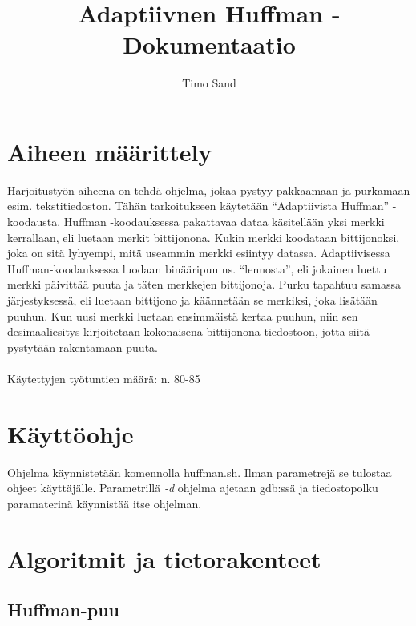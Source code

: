 \documentclass[11pt,a4paper,draft]{article}
\author{Timo Sand}
\title{Adaptiivnen Huffman - Dokumentaatio}
\begin{document}
	
	
	\pagestyle{headings}
	
	\tableofcontents
	\thispagestyle{empty}
	\newpage
	\setcounter{page}{1}
	
	\section{Aiheen määrittely} %
	\label{sec:aiheen_maarittely}
	
	Harjoitustyön aiheena on tehdä ohjelma, jokaa pystyy pakkaamaan ja purkamaan 
	esim. tekstitiedoston. Tähän tarkoitukseen käytetään “Adaptiivista Huffman” -koodausta. 
	Huffman -koodauksessa pakattavaa dataa käsitellään yksi merkki kerrallaan, eli luetaan 
	merkit bittijonona. Kukin merkki koodataan bittijonoksi, joka on sitä lyhyempi, mitä 
	useammin merkki esiintyy datassa. Adaptiivisessa Huffman-koodauksessa luodaan 
	binääripuu ns. “lennosta”, eli jokainen luettu merkki päivittää puuta ja täten merkkejen 
	bittijonoja. Purku tapahtuu samassa järjestyksessä, eli luetaan bittijono ja käännetään se merkiksi, joka lisätään puuhun. 
	Kun uusi merkki luetaan ensimmäistä kertaa puuhun, niin sen desimaaliesitys kirjoitetaan kokonaisena bittijonona 
	tiedostoon, jotta siitä pystytään rakentamaan puuta.
	\\\\
	Käytettyjen työtuntien määrä: n. 80-85
	
	
	\section{Käyttöohje} %
	\label{sec:kayttoohje}
	
	Ohjelma käynnistetään komennolla huffman.sh. Ilman parametrejä se tulostaa ohjeet käyttäjälle. 
	Parametrillä \emph{-d} ohjelma ajetaan gdb:ssä ja tiedostopolku paramaterinä käynnistää itse ohjelman.
	
	
	\section{Algoritmit ja tietorakenteet} %
	\label{sec:algoritmit_ja_tietorakenteet}
	
		\subsection{Huffman-puu} %
		\label{sub:huffman_puu}
		
\end{document}
